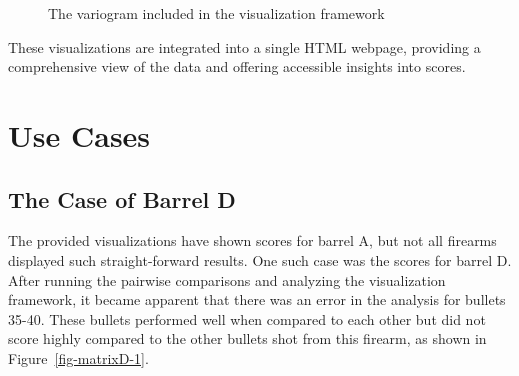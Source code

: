 \documentclass[
  12pt]{article}
\begin{document}
\begin{figure}


\caption{\label{fig-variogramA}The variogram included in the
visualization framework}

\end{figure}%

These visualizations are integrated into a single HTML webpage,
providing a comprehensive view of the data and offering accessible
insights into scores.

\section{Use Cases}\label{use-cases}

\subsection{The Case of Barrel D}\label{the-case-of-barrel-d}

The provided visualizations have shown scores for barrel A, but not all
firearms displayed such straight-forward results. One such case was the
scores for barrel D. After running the pairwise comparisons and
analyzing the visualization framework, it became apparent that there was
an error in the analysis for bullets 35-40. These bullets performed well
when compared to each other but did not score highly compared to the
other bullets shot from this firearm, as shown in
Figure~\ref{fig-matrixD-1}.
\end{document}
